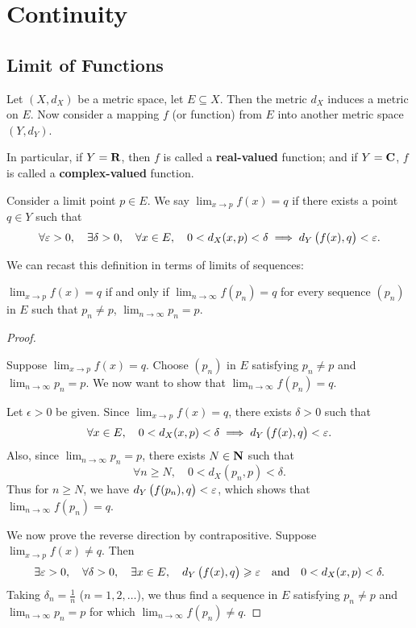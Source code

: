 \chapter{Continuity}\label{chap:real-analysis_continuity}
\section{Limit of Functions}
Let $(X,d_X)$ be a metric space, let $E\subseteq X$. Then the metric $d_X$ induces a metric on $E$. Now consider a mapping $f$ (or function) from $E$ into another metric space $(Y,d_Y)$.

\begin{remark}
In particular, if $Y=\mathbf R$, then $f$ is called a \textbf{real-valued} function; and if $Y=\mathbf C$, $f$ is called a \textbf{complex-valued} function.
\end{remark}

\begin{definition}\label{defn:limit-function}
Consider a limit point $p\in E$. We say $\displaystyle\lim_{x\to p}f(x)=q$ if there exists a point $q\in Y$ such that
\[\forall\varepsilon>0,\quad\exists\delta>0,\quad\forall x\in E,\quad0<d_X(x,p)<\delta\implies d_Y\left(f(x),q\right)<\varepsilon.\]
\end{definition}

We can recast this definition in terms of limits of sequences:
\begin{theorem}\label{limit-func-seq}
$\displaystyle\lim_{x\to p}f(x)=q$ if and only if $\displaystyle\lim_{n\to\infty}f(p_n)=q$ for every sequence $(p_n)$ in $E$ such that $p_n \neq p$, $\displaystyle\lim_{n\to\infty}p_n=p$.
\end{theorem}

\begin{proof} \

\fbox{$\implies$} Suppose $\displaystyle\lim_{x\to p}f(x)=q$. Choose $(p_n)$ in $E$ satisfying $p_n \neq p$ and $\displaystyle\lim_{n\to\infty}p_n=p$. We now want to show that $\displaystyle\lim_{n\to\infty}f(p_n)=q$.

Let $\epsilon>0$ be given. Since $\displaystyle\lim_{x\to p}f(x)=q$, there exists $\delta>0$ such that 
\[\forall x\in E,\quad0<d_X(x,p)<\delta\implies d_Y\left(f(x),q\right)<\varepsilon.\]
Also, since $\displaystyle\lim_{n\to\infty}p_n=p$, there exists $N\in\mathbf N$ such that
\[\forall n\ge N,\quad 0<d_X(p_n,p)<\delta.\]
Thus for $n\ge N$, we have $d_Y\left(f(p_n),q\right)<\varepsilon$, which shows that $\displaystyle\lim_{n\to\infty}f(p_n)=q$.

\fbox{$\impliedby$} We now prove the reverse direction by contrapositive. Suppose $\displaystyle\lim_{x\to p}f(x)\neq q$. Then
\[\exists\varepsilon>0,\quad\forall\delta>0,\quad\exists x\in E,\quad d_Y\left(f(x),q\right)\geqslant\varepsilon\quad\text{and}\quad0<d_X(x,p)<\delta.\]
Taking $\delta_n=\frac{1}{n}$ ($n=1,2,\dots$), we thus find a sequence in $E$ satisfying $p_n \neq p$ and $\displaystyle\lim_{n\to\infty}p_n=p$ for which $\displaystyle\lim_{n\to\infty}f(p_n)\neq q$.
\end{proof}

